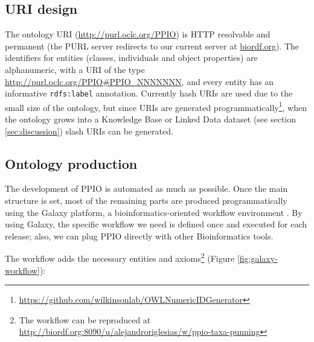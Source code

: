 \documentclass[sw]{iosart2c}
\newcommand{\myurl}[1]{\footnote{\url{#1}}}
\newcommand{\con}[1]{\texttt{#1}\xspace}
\begin{document}
\subsection{URI design}
The ontology URI (\url{http://purl.oclc.org/PPIO}) is HTTP resolvable and permanent (the PURL server redirects to our current server at \url{biordf.org}). The identifiers for entities (classes, individuals and object properties) are alphanumeric, with a URI of the type \url{http://purl.oclc.org/PPIO#PPIO_NNNNNNN}, and every entity has an informative \con{rdfs:label} annotation. Currently hash URIs are used due to the small size of the ontology, but since URIs are generated programmatically\myurl{https://github.com/wilkinsonlab/OWLNumericIDGenerator}, when the ontology grows into a Knowledge Base or Linked Data dataset (see section \ref{sec:discussion}) slash URIs can be generated.

\subsection{Ontology production}
The development of PPIO is automated as much as possible. Once the main structure is set, most of the remaining parts are produced programmatically using the Galaxy platform, a bioinformatics-oriented workflow environment \cite{galaxy}. By using Galaxy, the specific workflow we need is defined once and executed for each release; also, we can plug PPIO directly with other Bioinformatics tools. 

The workflow adds the necessary entities and axioms\footnote{The workflow can be reproduced at \url{http://biordf.org:8090/u/alejandroriglesias/w/ppio-taxa-punning}} (Figure \ref{fig:galaxy-workflow}):
\end{document}
